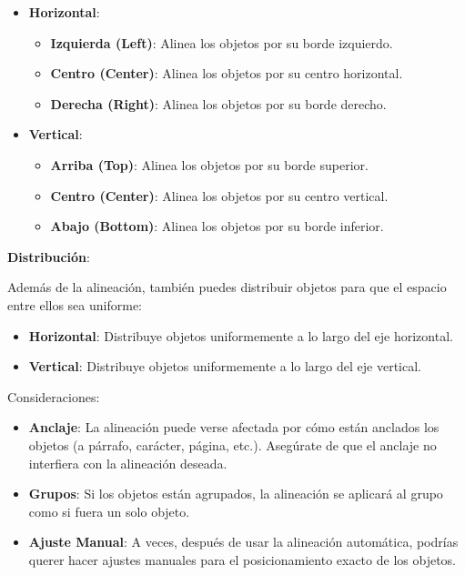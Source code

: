 \documentclass[
  jou,
  floatsintext,
  longtable,
  a4paper,
  nolmodern,
  notxfonts,
  notimes,
  12pt,
  colorlinks=true,linkcolor=blue,citecolor=blue,urlcolor=blue]{apa7}
\begin{document}
\begin{itemize}
\item
  \textbf{Horizontal}:

  \begin{itemize}
  \item
    \textbf{Izquierda (Left)}: Alinea los objetos por su borde
    izquierdo.
  \item
    \textbf{Centro (Center)}: Alinea los objetos por su centro
    horizontal.
  \item
    \textbf{Derecha (Right)}: Alinea los objetos por su borde derecho.
  \end{itemize}
\item
  \textbf{Vertical}:

  \begin{itemize}
  \item
    \textbf{Arriba (Top)}: Alinea los objetos por su borde superior.
  \item
    \textbf{Centro (Center)}: Alinea los objetos por su centro vertical.
  \item
    \textbf{Abajo (Bottom)}: Alinea los objetos por su borde inferior.
  \end{itemize}
\end{itemize}

\textbf{Distribución}:

Además de la alineación, también puedes distribuir objetos para que el
espacio entre ellos sea uniforme:

\begin{itemize}
\item
  \textbf{Horizontal}: Distribuye objetos uniformemente a lo largo del
  eje horizontal.
\item
  \textbf{Vertical}: Distribuye objetos uniformemente a lo largo del eje
  vertical.
\end{itemize}

Consideraciones:

\begin{itemize}
\item
  \textbf{Anclaje}: La alineación puede verse afectada por cómo están
  anclados los objetos (a párrafo, carácter, página, etc.). Asegúrate de
  que el anclaje no interfiera con la alineación deseada.
\item
  \textbf{Grupos}: Si los objetos están agrupados, la alineación se
  aplicará al grupo como si fuera un solo objeto.
\item
  \textbf{Ajuste Manual}: A veces, después de usar la alineación
  automática, podrías querer hacer ajustes manuales para el
  posicionamiento exacto de los objetos.
\end{itemize}
\end{document}
